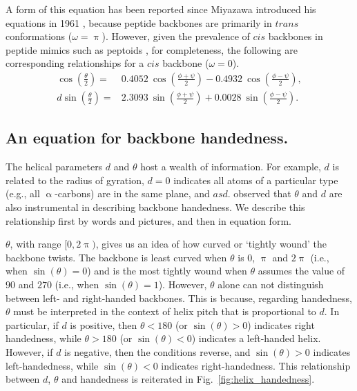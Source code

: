 \documentclass[fleqn,10pt]{wlpeerj} %
\newcommand{\Fig}[1]{Fig.~\ref{#1}}
\begin{document}
A form of this equation has been reported since Miyazawa introduced his equations in 1961 \citep{Miyazawa1961,Zacharias2013}, because peptide backbones are primarily in $trans$ conformations ($\omega=\uppi$). However, given the prevalence of $cis$ backbones in peptide mimics such as peptoids \citep{Mirijanian2014,Gorske2016}, for completeness, the following are corresponding relationships for a $cis$ backbone ($\omega=0$).
\begin{align}
\label{eqn:theta_cis}
\cos\left(\frac{\theta}{2}\right) =& 0.4052~\cos\left(\frac{\phi+\psi}{2}\right)
                                    -0.4932~\cos\left(\frac{\phi-\psi}{2}\right), \\
\label{eqn:theta_d}
d \sin\left(\frac{\theta}{2}\right) = & 2.3093~\sin\left(\frac{\phi+\psi}{2}\right)
                                       +0.0028~\sin\left(\frac{\phi-\psi}{2}\right).
\end{align}

\subsection*{An equation for backbone handedness.} 
The helical parameters $d$ and $\theta$ host a wealth of information. For example, $d$ is related to the radius of gyration, $d=0$ indicates all atoms of a particular type (e.g., all $\upalpha$-carbons) are in the same plane, and $asd$. \cite{Zacharias2013} observed that $\theta$ and $d$ are also instrumental in describing backbone handedness. We describe this relationship first by words and pictures, and then in equation form. 

$\theta$, with range $[0,2\uppi)$, gives us an idea of how curved or `tightly wound' the backbone twists. The backbone is least curved when $\theta$ is $0$, $\uppi$ and $2\uppi$ (i.e., when $\sin(\theta) = 0$) and is the most tightly wound when $\theta$ assumes the value of  $90$ and $270$ (i.e., when $\sin(\theta) = 1$). However, $\theta$ alone can not distinguish between left- and right-handed backbones. This is because, regarding handedness, $\theta$ must be interpreted in the context of helix pitch that is proportional to $d$. In particular, if $d$ is positive, then $\theta < 180$ (or $\sin(\theta)>0$) indicates right handedness, while $\theta > 180$ (or $\sin(\theta)<0$) indicates a left-handed helix. However, if $d$ is negative, then the conditions reverse, and $\sin(\theta)>0$ indicates left-handedness, while $\sin(\theta)<0$ indicates right-handedness. This relationship between $d$, $\theta$ and  handedness is reiterated in \Fig{fig:helix_handedness}.
\end{document}
